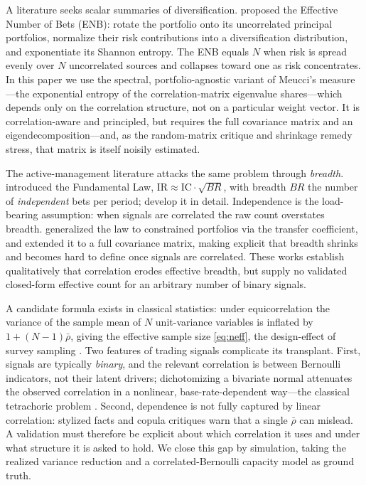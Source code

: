 \documentclass[11pt]{article}
\newcommand{\rbar}{\bar{\rho}}
\begin{document}
A literature seeks scalar summaries of diversification.
\citet{meucci2009managing} proposed the Effective Number of Bets (ENB): rotate the
portfolio onto its uncorrelated principal portfolios, normalize their risk
contributions into a diversification distribution, and exponentiate its Shannon
entropy. The ENB equals $N$ when risk is spread evenly over $N$ uncorrelated
sources and collapses toward one as risk concentrates. In this paper we use the
spectral, portfolio-agnostic variant of Meucci's measure---the exponential
entropy of the correlation-matrix eigenvalue shares---which depends only on the
correlation structure, not on a particular weight vector. It is
correlation-aware and principled, but requires the full covariance matrix and an
eigendecomposition---and, as the random-matrix critique
\citep{laloux1999noise} and shrinkage remedy \citep{ledoit2004honey} stress, that
matrix is itself noisily estimated.

The active-management literature attacks the same problem through \emph{breadth}.
\citet{grinold1989fundamental} introduced the Fundamental Law,
$\mathrm{IR}\approx\mathrm{IC}\cdot\sqrt{BR}$, with breadth $BR$ the number of
\emph{independent} bets per period; \citet{grinold2000active} develop it in detail.
Independence is the load-bearing assumption: when signals are correlated the raw
count overstates breadth. \citet{clarke2002portfolio} generalized the law to
constrained portfolios via the transfer coefficient, and
\citet{clarke2006fundamental} extended it to a full covariance matrix, making
explicit that breadth shrinks and becomes hard to define once signals are
correlated. These works establish qualitatively that correlation erodes effective
breadth, but supply no validated closed-form effective count for an arbitrary
number of binary signals.

A candidate formula exists in classical statistics: under equicorrelation the
variance of the sample mean of $N$ unit-variance variables is inflated by
$1+(N-1)\rbar$, giving the effective sample size \eqref{eq:neff}, the
design-effect of survey sampling \citep{kish1965survey}. Two features of trading
signals complicate its transplant. First, signals are typically \emph{binary}, and
the relevant correlation is between Bernoulli indicators, not their latent drivers;
dichotomizing a bivariate normal attenuates the observed correlation in a
nonlinear, base-rate-dependent way---the classical tetrachoric problem
\citep{pearson1900tetrachoric}. Second, dependence is not fully captured by linear
correlation: stylized facts \citep{cont2001empirical} and copula critiques
\citep{embrechts2002correlation} warn that a single $\rbar$ can mislead. A
validation must therefore be explicit about which correlation it uses and under
what structure it is asked to hold. We close this gap by simulation, taking the
realized variance reduction and a correlated-Bernoulli capacity model as ground
truth.
\end{document}
